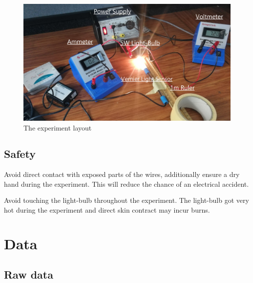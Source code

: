 \documentclass[a4paper,12pt]{article}
\begin{document}
\begin{figure}[H]
 \centering
 \includegraphics[width=\textwidth]{assets/setuppic.png}
 \caption{The experiment layout}
 \label{fig:layout}
\end{figure}


\subsection{Safety}
Avoid direct contact with exposed parts of the wires, additionally ensure a dry hand during the experiment. This will reduce the chance of an electrical accident.

Avoid touching the light-bulb throughout the experiment. The light-bulb got very hot during the experiment and direct skin contract may incur burns.

\section{Data}
\subsection{Raw data}

\end{document}
